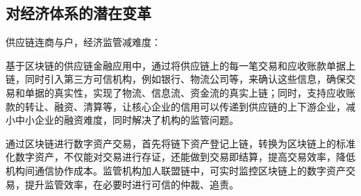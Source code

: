 \subsection{对经济体系的潜在变革}

供应链连商与户，经济监管减难度：

基于区块链的供应链金融应用中，通过将供应链上的每一笔交易和应收账款单据上链，同时引入第三方可信机构，例如银行、物流公司等，来确认这些信息，确保交易和单据的真实性，实现了物流、信息流、资金流的真实上链；同时，支持应收账款的转让、融资、清算等，让核心企业的信用可以传递到供应链的上下游企业，减小中小企业的融资难度，同时解决了机构的监管问题。

通过区块链进行数字资产交易，首先将链下资产登记上链，转换为区块链上的标准化数字资产，不仅能对交易进行存证，还能做到交易即结算，提高交易效率，降低机构间通信协作成本。监管机构加人联盟链中，可实时监控区块链上的数字资产交易，提升监管效率，在必要时进行可信的仲裁、追责。
